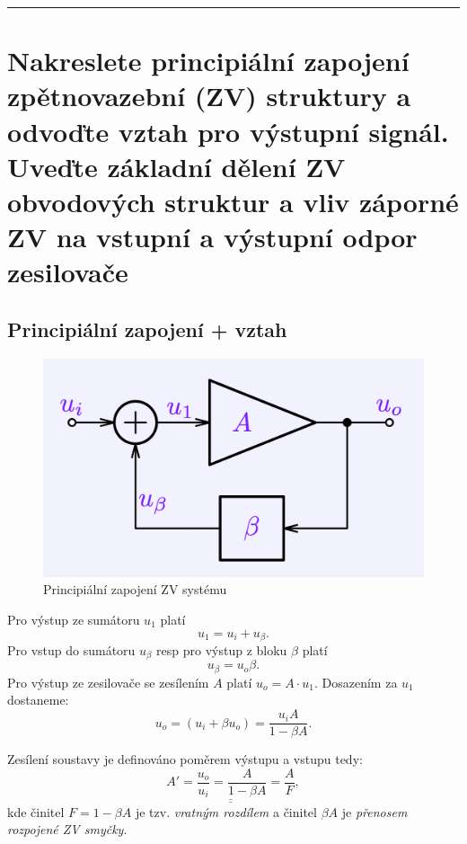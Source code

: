 \documentclass[a4paper,12pt]{article}   %
\begin{document}
\hrule%









\section{Nakreslete principiální zapojení zpětnovazební (ZV) struktury a odvoďte vztah pro výstupní signál. Uveďte základní dělení ZV obvodových struktur a vliv záporné ZV na vstupní a výstupní odpor zesilovače}
\subsection{Principiální zapojení + vztah}


\begin{figure}[h!]
    \centering
    \includegraphics[width=.5\textwidth]{ZV_princip.png}
    \caption{Principiální zapojení ZV systému}
    \label{fig:zv:princip}
\end{figure}

Pro výstup ze sumátoru $u_\text{1}$ platí
\begin{equation*}
    u_\text{1} = u_i + u_\beta.
\end{equation*}
Pro vstup do sumátoru $u_\beta$ resp pro výstup z bloku $\beta$ platí
\begin{equation*}
    u_\beta = u_o \beta.
\end{equation*}
Pro výstup ze zesilovače se zesílením $A$ platí $u_o = A\cdot u_\text{1}$. Dosazením za $u_\text{1}$ dostaneme:
\begin{equation*}
    u_o = (u_i + \beta u_o) = \frac{u_i A}{1-\beta A}.
\end{equation*}

Zesílení soustavy je definováno poměrem výstupu a vstupu tedy:
\begin{equation}
    \underline{\underline{A' = \frac{u_o}{u_i} = \frac{A}{1-\beta A} = \frac{A}{F}}},
\end{equation}
kde činitel $F = 1-\beta A$ je tzv. \textit{vratným rozdílem} a činitel $\beta A$ je \textit{přenosem rozpojené ZV smyčky}. 
\end{document}
